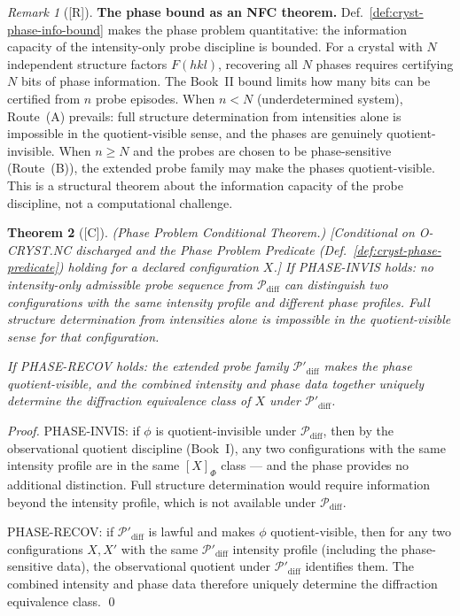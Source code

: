 \documentclass[12pt,oneside]{amsbook}
\theoremstyle{plain}
\newtheorem{theorem}{Theorem}[section]
\theoremstyle{definition}
\theoremstyle{remark}
\newtheorem{remark}[theorem]{Remark}
\newcommand{\status}[1]{\textup{[#1]}}
\begin{document}
\begin{remark}[\status{R}]\label{rem:cryst-phase-bound-note}
\textbf{The phase bound as an NFC theorem.}
Def.~\ref{def:cryst-phase-info-bound} makes the phase problem
quantitative: the information capacity of the intensity-only probe
discipline is bounded.  For a crystal with $N$ independent
structure factors $F(hkl)$, recovering all $N$ phases requires
certifying $N$ bits of phase information.  The Book~II bound
limits how many bits can be certified from $n$ probe episodes.
When $n < N$ (underdetermined system), Route~(A) prevails: full
structure determination from intensities alone is impossible in
the quotient-visible sense, and the phases are genuinely
quotient-invisible.  When $n \ge N$ and the probes are chosen to
be phase-sensitive (Route~(B)), the extended probe family may
make the phases quotient-visible.  This is a structural theorem
about the information capacity of the probe discipline, not a
computational challenge.
\end{remark}

\begin{theorem}[\status{C}]\label{thm:cryst-phase-conditional}
\textup{(Phase Problem Conditional Theorem.)}
\textup{[Conditional on O-CRYST.NC discharged and the Phase
Problem Predicate (Def.~\ref{def:cryst-phase-predicate})
holding for a declared configuration $X$.]}
If PHASE-INVIS holds: no intensity-only admissible probe sequence
from $\mathcal{P}_{\mathrm{diff}}$ can distinguish two
configurations with the same intensity profile and different phase
profiles.  Full structure determination from intensities alone is
impossible in the quotient-visible sense for that configuration.

If PHASE-RECOV holds: the extended probe family
$\mathcal{P}'_{\mathrm{diff}}$ makes the phase quotient-visible,
and the combined intensity and phase data together uniquely
determine the diffraction equivalence class of $X$ under
$\mathcal{P}'_{\mathrm{diff}}$.
\end{theorem}

\begin{proof}
PHASE-INVIS: if $\phi$ is quotient-invisible under
$\mathcal{P}_{\mathrm{diff}}$, then by the observational quotient
discipline (Book~I), any two configurations with the same intensity
profile are in the same $[X]_{\Phi}$ class --- and the phase
provides no additional distinction.  Full structure determination
would require information beyond the intensity profile, which is
not available under $\mathcal{P}_{\mathrm{diff}}$.

PHASE-RECOV: if $\mathcal{P}'_{\mathrm{diff}}$ is lawful and
makes $\phi$ quotient-visible, then for any two configurations
$X, X'$ with the same $\mathcal{P}'_{\mathrm{diff}}$ intensity
profile (including the phase-sensitive data), the observational
quotient under $\mathcal{P}'_{\mathrm{diff}}$ identifies them.
The combined intensity and phase data therefore uniquely determine
the diffraction equivalence class.
\qed
\end{proof}
\end{document}
